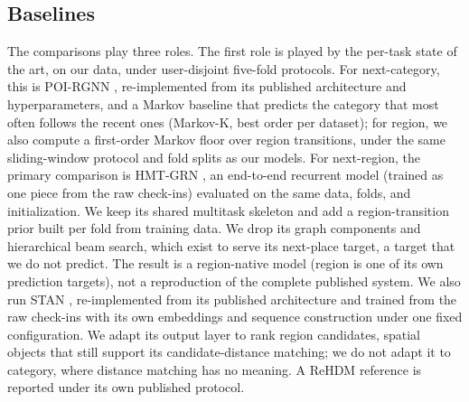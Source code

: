 
\subsection{Baselines}
\label{sec:mobiwac:setup-baselines}
The comparisons play three roles. The first role is played by the per-task state of the art, on our data, under user-disjoint five-fold protocols. For next-category, this is POI-RGNN \cite{capanema2023poirgnn}, re-implemented from its published architecture and hyperparameters, and a Markov baseline that predicts the category that most often follows the recent ones (Markov-K, best order per dataset); for region, we also compute a first-order Markov floor over region transitions, under the same sliding-window protocol and fold splits as our models. For next-region, the primary comparison is HMT-GRN \cite{Lim2022}, an end-to-end recurrent model (trained as one piece from the raw check-ins) evaluated on the same data, folds, and initialization. We keep its shared multitask skeleton and add a region-transition prior built per fold from training data. We drop its graph components and hierarchical beam search, which exist to serve its next-place target, a target that we do not predict. The result is a region-native model (region is one of its own prediction targets), not a reproduction of the complete published system. We also run STAN \cite{luo2021stan}, re-implemented from its published architecture and trained from the raw check-ins with its own embeddings and sequence construction under one fixed configuration. We adapt its output layer to rank region candidates, spatial objects that still support its candidate-distance matching; we do not adapt it to category, where distance matching has no meaning. A ReHDM \cite{li2025rehdm} reference is reported under its own published protocol.

